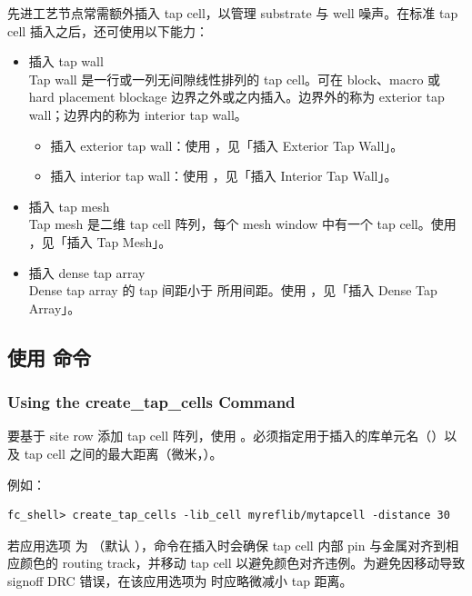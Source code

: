 先进工艺节点常需额外插入 tap cell，以管理 substrate 与 well 噪声。在标准 tap cell 插入之后，还可使用以下能力：
\begin{itemize}
  \item 插入 tap wall\\
        Tap wall 是一行或一列无间隙线性排列的 tap cell。可在 block、macro 或 hard placement blockage 边界之外或之内插入。边界外的称为 exterior tap wall；边界内的称为 interior tap wall。
        \begin{itemize}
          \item 插入 exterior tap wall：使用 ，见「插入 Exterior Tap Wall」。
          \item 插入 interior tap wall：使用 ，见「插入 Interior Tap Wall」。
        \end{itemize}
  \item 插入 tap mesh\\
        Tap mesh 是二维 tap cell 阵列，每个 mesh window 中有一个 tap cell。使用 ，见「插入 Tap Mesh」。
  \item 插入 dense tap array\\
        Dense tap array 的 tap 间距小于  所用间距。使用 ，见「插入 Dense Tap Array」。
\end{itemize}

\subsection{使用  命令}
\subsubsection*{Using the create\_tap\_cells Command}

要基于 site row 添加 tap cell 阵列，使用 。必须指定用于插入的库单元名（）以及 tap cell 之间的最大距离（微米，）。

例如：
\begin{lstlisting}
fc_shell> create_tap_cells -lib_cell myreflib/mytapcell -distance 30
\end{lstlisting}

\begin{noteBox}
若应用选项  为 （默认 ），命令在插入时会确保 tap cell 内部 pin 与金属对齐到相应颜色的 routing track，并移动 tap cell 以避免颜色对齐违例。为避免因移动导致 signoff DRC 错误，在该应用选项为  时应略微减小 tap 距离。
\end{noteBox}

